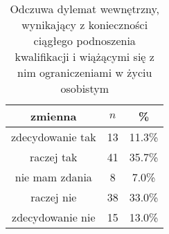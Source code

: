 \begin{table}[H]
\caption{Odczuwa dylemat wewnętrzny, wynikający z konieczności ciągłego podnoszenia kwalifikacji i wiążącymi się z nim ograniczeniami w życiu osobistym}
\centering
\begin{tabular}{ | c | c | c |}
\hline
zmienna & $n$ & \% \\
\hline
zdecydowanie tak  &  13  & 11.3\% \\
\hline
raczej tak  &  41  & 35.7\% \\
\hline
nie mam zdania  &  8  & 7.0\% \\
\hline
raczej nie  &  38  & 33.0\% \\
\hline
zdecydowanie nie  &  15  & 13.0\% \\
\hline
\end{tabular}
\label{tab:Q14}
\end{table}

